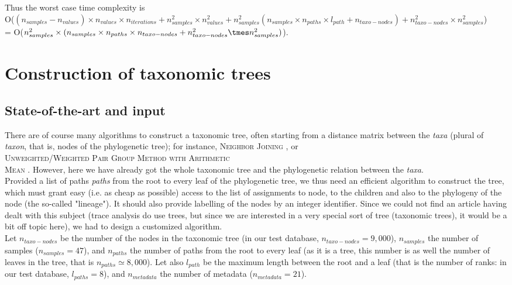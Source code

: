 \documentclass{report}
\begin{document}
Thus the worst case time complexity is\\
O($(n_{samples} - n_{values}) \times n_{values} \times n_{iterations} + n_{samples}^{2} \times n_{values}^{2} + n_{samples}^{2} (n_{samples} \times n_{paths} \times l_{path} + n_{taxo-nodes}) + n_{taxo-nodes}^{2} \times n_{samples}^{2}$)\\
= O($n_{samples}^{2} \times (n_{samples} \times n_{paths} \times n_{taxo-nodes} + n_{taxo-nodes}^{2} \tmes n_{samples}^{2})$).

\chapter{Construction of taxonomic trees}

\section{State-of-the-art and input}

There are of course many algorithms to construct a taxonomic tree, often starting from a distance matrix between the \emph{taxa} (plural of \emph{taxon}, that is, nodes of the phylogenetic tree); for instance, \textsc{Neighbor Joining} \cite{NeighborJoining}, or \\ \textsc{Unweighted/Weighted Pair Group Method with Arithmetic\\ Mean} \cite{UMPGA}. However, here we have already got the whole taxonomic tree and the phylogenetic relation between the \emph{taxa}.\\

Provided a list of paths \emph{paths} from the root to every leaf of the phylogenetic tree, we thus need an efficient algorithm to construct the tree, which must grant easy (i.e. as cheap as possible) access to the list of assignments to node, to the children and also to the phylogeny of the node (the so-called "lineage"). It should also provide labelling of the nodes by an integer identifier. Since we could not find an article having dealt with this subject (trace analysis do use trees, but since we are interested in a very special sort of tree (taxonomic trees), it would be a bit off topic here), we had to design a customized algorithm.\\

Let $n_{taxo-nodes}$ be the number of the nodes in the taxonomic tree (in our test database, $n_{taxo-nodes} = 9,000$), $n_{samples}$ the number of samples ($n_{samples} = 47$), and $n_{paths}$ the number of paths from the root to every leaf (as it is a tree, this number is as well the number of leaves in the tree, that is $n_{paths} \simeq 8,000$). Let also $l_{path}$ be the maximum length between the root and a leaf (that is the number of ranks: in our test database, $l_{paths} = 8$), and $n_{metadata}$ the number of metadata ($n_{metadata} = 21$).
\end{document}
